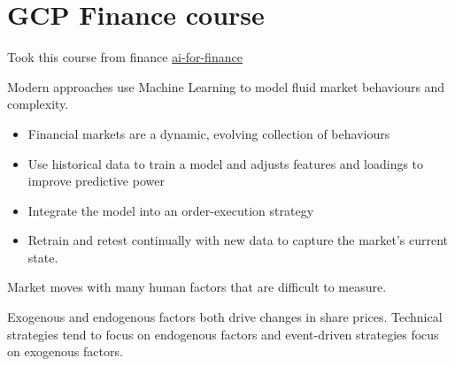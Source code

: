 

\section{GCP Finance course}

Took this course from finance
\href{https://github.com/GoogleCloudPlatform/training-data-analyst/tree/master/courses/ai-for-finance}{ai-for-finance}


Modern approaches use Machine Learning
to model fluid market behaviours and complexity.

\begin{itemize}
\item Financial markets are a dynamic, evolving collection of behaviours
\item Use historical data to train a model and adjusts
features and loadings to improve predictive power
\item Integrate the model into an order-execution strategy
\item Retrain and retest continually with new data
to capture the market's current state.
\end{itemize}


Market moves with many human factors that are difficult to measure.

Exogenous and endogenous factors both drive
changes in share prices. Technical strategies tend
to focus on endogenous factors and event-driven
strategies focus on exogenous factors.